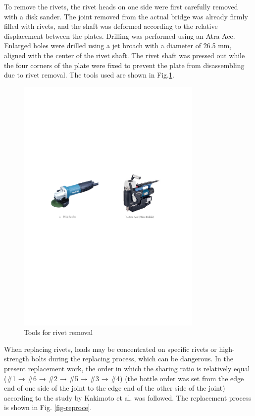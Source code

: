 To remove the rivets, the rivet heads on one side were first carefully removed with a disk sander. The joint removed from the actual bridge was already firmly filled with rivets, and the shaft was deformed according to the relative displacement between the plates. Drilling was performed using an Atra-Ace. Enlarged holes were drilled using a jet broach with a diameter of 26.5 mm, aligned with the center of the rivet shaft. The rivet shaft was pressed out while the four corners of the plate were fixed to prevent the plate from disassembling due to rivet removal. The tools used are shown in Fig.\ref{fig-retool}.

\begin{figure}[htbp]
    \centering
    \includegraphics[width=0.8\textwidth]{imgs/ch3/retool.pdf}
    \caption{Tools for rivet removal}
    \label{fig-retool}
\end{figure}

When replacing rivets, loads may be concentrated on specific rivets or high-strength bolts during the replacing process, which can be dangerous. In the present replacement work, the order in which the sharing ratio is relatively equal (\#1 → \#6 → \#2 → \#5 → \#3 → \#4) (the bottle order was set from the edge end of one side of the joint to the edge end of the other side of the joint) according to the study by Kakimoto et al. \cite{kakimoto2002Mechanical} was followed.  The replacement process is shown in Fig. \ref{fig-reproce}.

